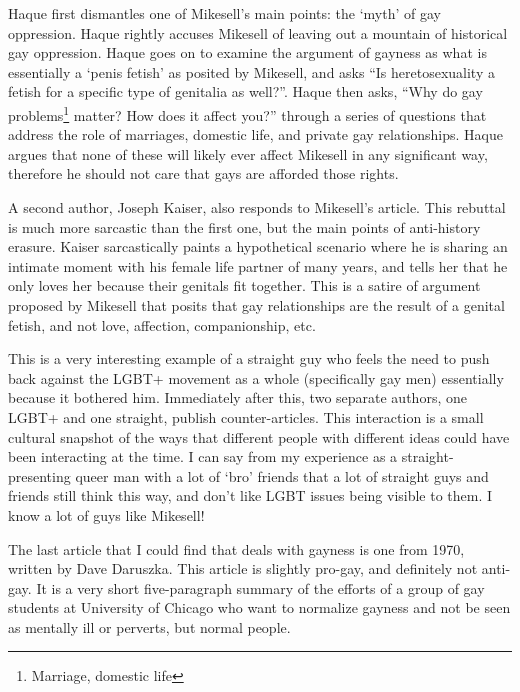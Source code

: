 \documentclass[a4paper,12pt]{article}
\begin{document}
	Haque first dismantles one of Mikesell's main points: the `myth' of gay oppression. Haque rightly accuses Mikesell of leaving out a mountain of historical gay oppression. Haque goes on to examine the argument of gayness as what is essentially a `penis fetish' as posited by Mikesell, and asks ``Is heretosexuality a fetish for a specific type of genitalia as well?''. Haque then asks, ``Why do gay problems\footnote{Marriage, domestic life} matter? How does it affect you?'' through a series of questions that address the role of marriages, domestic life, and private gay relationships. Haque argues that none of these will likely ever affect Mikesell in any significant way, therefore he should not care that gays are afforded those rights.
	
	A second author, Joseph Kaiser, also responds to Mikesell's article. \cite{counterantigay2} This rebuttal is much more sarcastic than the first one, but the main points of anti-history erasure. Kaiser sarcastically paints a hypothetical scenario where he is sharing an intimate moment with his female life partner of many years, and tells her that he only loves her because their genitals fit together. This is a satire of argument proposed by Mikesell that posits that gay relationships are the result of a genital fetish, and not love, affection, companionship, etc.

	This is a very interesting example of a straight guy who feels the need to push back against the LGBT+ movement as a whole (specifically gay men) essentially because it bothered him. Immediately after this, two separate authors, one LGBT+ and one straight, publish counter-articles. This interaction is a small cultural snapshot of the ways that different people with different ideas could have been interacting at the time. I can say from my experience as a straight-presenting queer man with a lot of `bro' friends that a lot of straight guys and friends still think this way, and don't like LGBT issues being visible to them. I know a lot of guys like Mikesell!

	The last article that I could find that deals with gayness is one from 1970, written by Dave Daruszka.\cite{progayold} This article is slightly pro-gay, and definitely not anti-gay. It is a very short five-paragraph summary of the efforts of a group of gay students at University of Chicago who want to normalize gayness and not be seen as mentally ill or perverts, but normal people. 

\newpage
\end{document}
